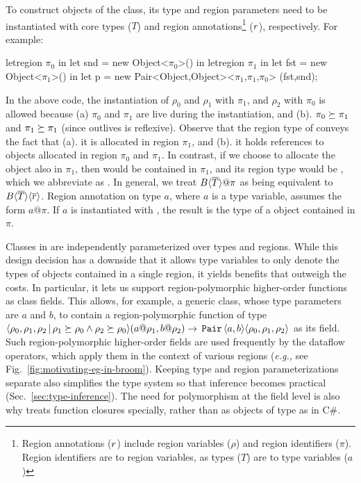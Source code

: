 To construct objects of the  class, its type and region
parameters need to be instantiated with core types ($T$) and region
annotations\footnote{Region annotations ($r$) include region
variables ($\rho$) and region identifiers ($\pi$). Region identifiers
are to region variables, as types ($T$) are to type variables ($a$)}
($r$), respectively. For example:
\begin{codejava}

letregion $\pi_0$ in
  let snd = new Object<$\pi_0$>() in
  letregion $\pi_1$ in
    let fst = new Object<$\pi_1$>() in
    let p = new Pair<Object,Object><$\pi_1$,$\pi_1$,$\pi_0$> (fst,snd);
\end{codejava}
In the above code, the instantiation of $\rho_0$ and $\rho_1$ with
$\pi_1$, and $\rho_2$ with $\pi_0$ is allowed because (a) $\pi_0$ and
$\pi_1$ are live during the instantiation, and (b). $\pi_0 \succeq
\pi_1$ and $\pi_1 \succeq \pi_1$ (since outlives is reflexive).
Observe that the region type of  conveys the fact that (a). it is
allocated in region $\pi_1$, and (b). it holds references to objects
allocated in region $\pi_0$ and $\pi_1$.  In contrast, if we choose to
allocate the  object also in $\pi_1$, then  would be
contained in $\pi_1$, and its region type would be
, which we abbreviate as
. In general, we treat
$B\inang{\tbar}@\pi$ as being equivalent to
$B\langle \overline{T} \rangle\langle \overline{r} \rangle$. Region annotation on type $a$, where
$a$ is a type variable, assumes the form $a@\pi$. If $a$ is
instantiated with , the result is the type of a
 object contained in  $\pi$.  

Classes in \FB are independently parameterized over types and regions.
While this design decision has a downside that it allows type
variables to only denote the types of objects contained in a single
region, it yields benefits that outweigh the costs. In particular, it
lets us support region-polymorphic higher-order functions as class
fields.  This allows, for example, a generic class, whose type
parameters are $a$ and $b$, to contain a region-polymorphic function
of type $\langle \rho_0,\rho_1,\rho_2 \,|\, \rho_1 \succeq \rho_0
\wedge \rho_2 \succeq \rho_0 \rangle(a@\rho_1,b@\rho_2) \rightarrow
\,{\tt Pair}\,\langle a,b \rangle\langle \rho_0,\rho_1,\rho_2 \rangle$ as its field. Such
region-polymorphic higher-order fields are used frequently by the
dataflow operators, which apply them in the context of various regions
(\emph{e.g.,} see Fig.~\ref{fig:motivating-eg-in-broom}). Keeping type
and region parameterizations separate also simplifies the type system
so that inference becomes practical (Sec.~\ref{sec:type-inference}).
The need for polymorphism at the field level is also why \FB treats
function closures specially, rather than as objects of type 
as in C\#.

